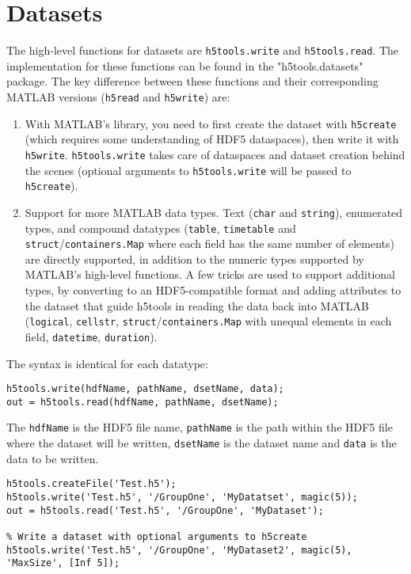 \documentclass[11pt]{exam}
\newcommand\myfcn[1]{\colorbox{codegray}{\textcolor{codeblue}{\texttt{#1}}}}
\newcommand\matfcn[1]{\textcolor{darkteal}{\texttt{#1}}}
\begin{document}
    \section{Datasets}\label{sec:Datasets}
        \noindent The high-level functions for datasets are \myfcn{h5tools.write} and \myfcn{h5tools.read}. The implementation for these functions can be found in the "h5tools.datasets" package. The key difference between these functions and their corresponding MATLAB versions (\matfcn{h5read} and \matfcn{h5write}) are:
        \begin{enumerate}
            \item With MATLAB's library, you need to first create the dataset with \myfcn{h5create} (which requires some understanding of HDF5 dataspaces), then write it with \matfcn{h5write}. \myfcn{h5tools.write} takes care of dataspaces and dataset creation behind the scenes (optional arguments to \myfcn{h5tools.write} will be passed to \matfcn{h5create}). 
            \item Support for more MATLAB data types. Text (\texttt{char} and \texttt{string}), enumerated types, and compound datatypes (\texttt{table}, \texttt{timetable} and \texttt{struct}/\texttt{containers.Map} where each field has the same number of elements) are directly supported, in addition to the numeric types supported by MATLAB's high-level functions. A few tricks are used to support additional types, by converting to an HDF5-compatible format and adding attributes to the dataset that guide h5tools in reading the data back into MATLAB (\texttt{logical}, \texttt{cellstr}, \texttt{struct}/\texttt{containers.Map} with unequal elements in each field, \texttt{datetime}, \texttt{duration}).  
        \end{enumerate}
        $\quad$\\
		The syntax is identical for each datatype:
		\begin{lstlisting}[style=matlab-editor, basicstyle=\mlttfamily\footnotesize]
h5tools.write(hdfName, pathName, dsetName, data);
out = h5tools.read(hdfName, pathName, dsetName);
		\end{lstlisting}
		The \texttt{hdfName} is the HDF5 file name, \texttt{pathName} is the path within the HDF5 file where the dataset will be written, \texttt{dsetName} is the dataset name and \texttt{data} is the data to be written.
		\begin{lstlisting}[style=matlab-editor, basicstyle=\mlttfamily\footnotesize]
% Write a dataset named 'MyDatatset' to' GroupOne'
h5tools.createFile('Test.h5');
h5tools.write('Test.h5', '/GroupOne', 'MyDatatset', magic(5));
out = h5tools.read('Test.h5', '/GroupOne', 'MyDataset');

% Write a dataset with optional arguments to h5create
h5tools.write('Test.h5', '/GroupOne', 'MyDataset2', magic(5), 'MaxSize', [Inf 5]);
		\end{lstlisting}
\end{document}
